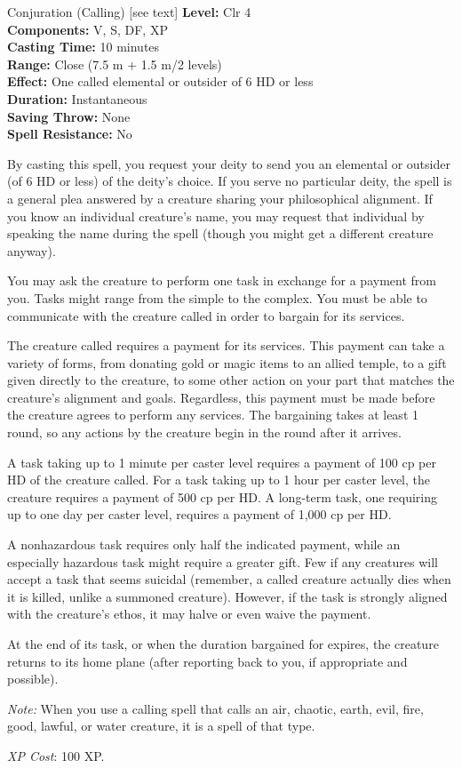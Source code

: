 {Conjuration (Calling) [see text]}
{
	\textbf{Level:}
	Clr 4\\
	\textbf{Components:}
	V, S, DF, XP\\
	\textbf{Casting Time:}
	10 minutes\\
	\textbf{Range:}
	Close (7.5 m + 1.5 m/2 levels)\\
	\textbf{Effect:}
	One called elemental or outsider of 6 HD or less\\
	\textbf{Duration:}
	Instantaneous\\
	\textbf{Saving Throw:}
	None\\
	\textbf{Spell Resistance:}
	No\\
}
{
	By casting this spell, you request your deity to send you an elemental or outsider (of 6 HD or less) of the deity's choice. If you serve no particular deity, the spell is a general plea answered by a creature sharing your philosophical alignment. If you know an individual creature's name, you may request that individual by speaking the name during the spell (though you might get a different creature anyway).

	You may ask the creature to perform one task in exchange for a payment from you. Tasks might range from the simple to the complex. You must be able to communicate with the creature called in order to bargain for its services.

	The creature called requires a payment for its services. This payment can take a variety of forms, from donating gold or magic items to an allied temple, to a gift given directly to the creature, to some other action on your part that matches the creature's alignment and goals. Regardless, this payment must be made before the creature agrees to perform any services. The bargaining takes at least 1 round, so any actions by the creature begin in the round after it arrives.

	A task taking up to 1 minute per caster level requires a payment of 100 cp per HD of the creature called. For a task taking up to 1 hour per caster level, the creature requires a payment of 500 cp per HD. A long-term task, one requiring up to one day per caster level, requires a payment of 1,000 cp per HD.

	A nonhazardous task requires only half the indicated payment, while an especially hazardous task might require a greater gift. Few if any creatures will accept a task that seems suicidal (remember, a called creature actually dies when it is killed, unlike a summoned creature). However, if the task is strongly aligned with the creature's ethos, it may halve or even waive the payment.

	At the end of its task, or when the duration bargained for expires, the creature returns to its home plane (after reporting back to you, if appropriate and possible).

	\textit{Note:} When you use a calling spell that calls an air, chaotic, earth, evil, fire, good, lawful, or water creature, it is a spell of that type.

	\textit{XP Cost}:
	100 XP.

}
